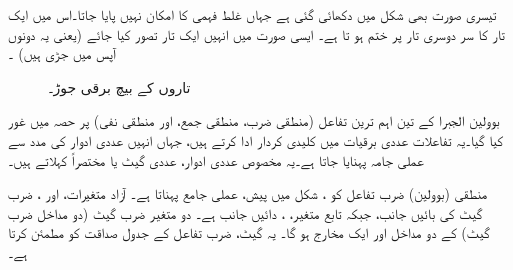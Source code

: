 تیسری صورت بھی شکل میں دکھائی گئی ہے جہاں غلط فہمی کا امکان نہیں پایا جاتا۔اس میں ایک تار کا سر دوسری تار پر ختم ہو تا ہے۔ ایسی صورت میں انہیں ایک تار تصور کیا جائے (یعنی یہ دونوں آپس میں جڑی ہیں) ۔
\begin{figure}
\centering
{}\quad\quad
{}\quad \quad 
{}
\caption{تاروں کے بیچ برقی جوڑ۔}
\label{شکل_بوولین_برقی_تار_جوڑ}
\end{figure}

 بوولین الجبرا کے تین اہم ترین تفاعل (منطقی ضرب، منطقی جمع، اور منطقی نفی)  پر حصہ  میں غور کیا گیا۔یہ تفاعلات عددی برقیات میں کلیدی کردار ادا کرتے ہیں، جہاں انہیں عددی ادوار کی مدد سے عملی  جامہ پہنایا جاتا ہے۔یہ مخصوص عددی ادوار، عددی گیٹ یا مختصراً  کہلاتے ہیں۔
 
منطقی (بوولین) ضرب تفاعل کو    ، شکل  میں پیش،   عملی جامع پہناتا  ہے۔  آزاد متغیرات،  اور ، ضرب گیٹ کی بائیں جانب،  جبکہ تابع متغیر، ، دائیں جانب ہے۔   دو متغیر ضرب گیٹ (دو مداخل ضرب گیٹ) کے دو مداخل اور ایک مخارج ہو گا۔ یہ گیٹ، ضرب تفاعل کے جدول  صداقت کو مطمئن کرتا ہے۔
	
